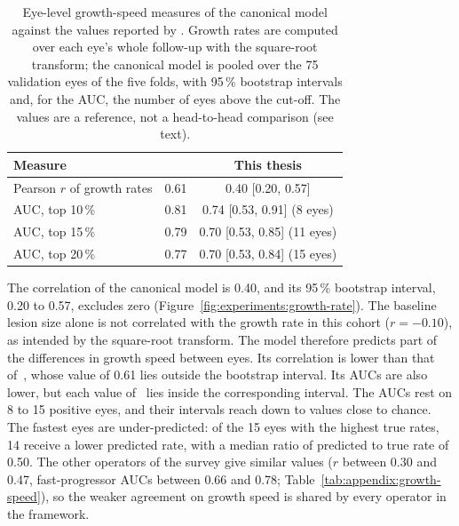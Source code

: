 \begin{table}[t]
  \centering
  \caption[Growth-speed measures against Mai et al. (2024).]{%
    Eye-level growth-speed measures of the canonical model against the
    values reported by \citet{Mai2024}. Growth rates are computed over each
    eye's whole follow-up with the square-root transform; the canonical
    model is pooled over the 75 validation eyes of the five folds, with
    95\,\% bootstrap intervals and, for the AUC, the number of eyes above
    the cut-off. The values are a reference, not a head-to-head comparison
    (see text).}
  \label{tab:experiments:mai}
  \small
  \begin{tabular}{l c c}
    \toprule
    Measure & \citet{Mai2024} & This thesis \\
    \midrule
    Pearson $r$ of growth rates & 0.61 & 0.40 [0.20, 0.57] \\
    AUC, top 10\,\% & 0.81 & 0.74 [0.53, 0.91] (8 eyes) \\
    AUC, top 15\,\% & 0.79 & 0.70 [0.53, 0.85] (11 eyes) \\
    AUC, top 20\,\% & 0.77 & 0.70 [0.53, 0.84] (15 eyes) \\
    \bottomrule
  \end{tabular}
\end{table}

The correlation of the canonical model is 0.40, and its 95\,\% bootstrap
interval, 0.20 to 0.57, excludes zero
(Figure~\ref{fig:experiments:growth-rate}). The baseline lesion size alone
is not correlated with the growth rate in this cohort ($r = -0.10$), as
intended by the square-root transform. The
model therefore predicts part of the differences in growth speed between
eyes. Its correlation is lower than that of~\citet{Mai2024}, whose value of
0.61 lies outside the bootstrap interval. Its AUCs are also lower, but each
value of~\citet{Mai2024} lies inside the corresponding interval.
The AUCs rest on 8 to 15 positive eyes, and their intervals reach down to
values close to chance. The fastest eyes are under-predicted: of the 15
eyes with the highest true rates, 14 receive a lower predicted rate, with a
median ratio of predicted to true rate of 0.50. The other operators of the
survey give similar values ($r$ between 0.30 and 0.47, fast-progressor
AUCs between 0.66 and 0.78; Table~\ref{tab:appendix:growth-speed}), so the
weaker agreement on growth speed is shared by every operator in the
framework.

